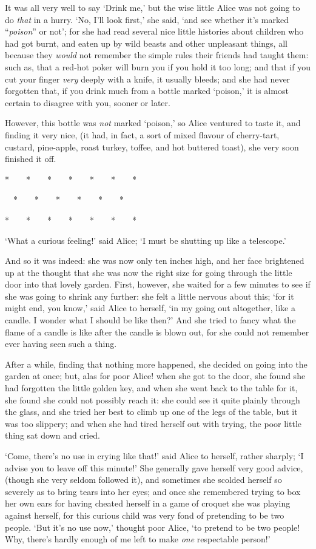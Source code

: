 \documentclass[12pt,openany]{memoir}
\newcommand{\sectionbreak}{
\vspace{0.1cm}
\begin{center}
*~~~~*~~~~*~~~~*~~~~*~~~~*~~~~*

~~*~~~~*~~~~*~~~~*~~~~*~~~~*~~~

*~~~~*~~~~*~~~~*~~~~*~~~~*~~~~*
\end{center}
\vspace{-0.2cm}
}
\begin{document}
It was all very well to say `Drink me,' but the wise little Alice was not going to do \textit{that} in a hurry. `No, I'll look first,' she said, `and see whether it's marked ``\textit{poison}'' or not'; for she had read several nice little histories about children who had got burnt, and eaten up by wild beasts and other unpleasant things, all because they \textit{would} not remember the simple rules their friends had taught them: such as, that a red-hot poker will burn you if you hold it too long; and that if you cut your finger \textit{very} deeply with a knife, it usually bleeds; and she had never forgotten that, if you drink much from a bottle marked `poison,' it is almost certain to disagree with you, sooner or later.

However, this bottle was \textit{not} marked `poison,' so Alice ventured to taste it, and finding it very nice, (it had, in fact, a sort of mixed flavour of cherry-tart, custard, pine-apple, roast turkey, toffee, and hot buttered toast), she very soon finished it off.

\sectionbreak

`What a curious feeling!' said Alice; `I must be shutting up like a telescope.'

And so it was indeed: she was now only ten inches high, and her face brightened up at the thought that she was now the right size for going through the little door into that lovely garden. First, however, she waited for a few minutes to see if she was going to shrink any further: she felt a little nervous about this; `for it might end, you know,' said Alice to herself, `in my going out altogether, like a candle. I wonder what I should be like then?' And she tried to fancy what the flame of a candle is like after the candle is blown out, for she could not remember ever having seen such a thing.

After a while, finding that nothing more happened, she decided on going into the garden at once; but, alas for poor Alice! when she got to the door, she found she had forgotten the little golden key, and when she went back to the table for it, she found she could not possibly reach it: she could see it quite plainly through the glass, and she tried her best to climb up one of the legs of the table, but it was too slippery; and when she had tired herself out with trying, the poor little thing sat down and cried.

`Come, there's no use in crying like that!' said Alice to herself, rather sharply; `I advise you to leave off this minute!' She generally gave herself very good advice, (though she very seldom followed it), and sometimes she scolded herself so severely as to bring tears into her eyes; and once she remembered trying to box her own ears for having cheated herself in a game of croquet she was playing against herself, for this curious child was very fond of pretending to be two people. `But it's no use now,' thought poor Alice, `to pretend to be two people! Why, there's hardly enough of me left to make \textit{one} respectable person!'
\end{document}

